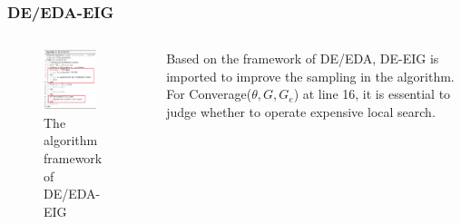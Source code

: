 \documentclass[xcolor=dvipsnames]{beamer}
\begin{document}
    \begin{frame}
    \frametitle{DE/EDA-EIG}
    \begin{columns}
        \begin{column}{0.5\textwidth}
        \begin{figure}[H]
            \graphicspath{{figs/}}
            \includegraphics[width=0.8\textwidth]{deeda-eig.png}
            \caption{The algorithm framework of DE/EDA-EIG}
        \end{figure}
    \end{column}
    \begin{column}{0.5\textwidth}
    Based on the framework of DE/EDA, DE-EIG is imported to improve the sampling in the algorithm. For Converage($\theta, G, G_e$) at line 16, it is essential to judge whether to operate expensive local search.
    \end{column}
    \end{columns}
    \end{frame}
\end{document}
